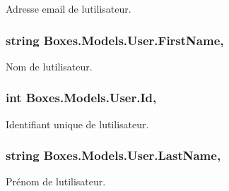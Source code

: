 Adresse email de l\textquotesingle{}utilisateur. 

\subsubsection[{\texorpdfstring{First\+Name}{FirstName}}]{\setlength{\rightskip}{0pt plus 5cm}string Boxes.\+Models.\+User.\+First\+Name\hspace{0.3cm}{\ttfamily [get]}, {\ttfamily [set]}}\hypertarget{class_boxes_1_1_models_1_1_user_aa913f41f67791db983b4189c205c1cb9}{}\label{class_boxes_1_1_models_1_1_user_aa913f41f67791db983b4189c205c1cb9}


Nom de l\textquotesingle{}utilisateur. 

\subsubsection[{\texorpdfstring{Id}{Id}}]{\setlength{\rightskip}{0pt plus 5cm}int Boxes.\+Models.\+User.\+Id\hspace{0.3cm}{\ttfamily [get]}, {\ttfamily [set]}}\hypertarget{class_boxes_1_1_models_1_1_user_a9a98125abfd7776a45590823f984eda1}{}\label{class_boxes_1_1_models_1_1_user_a9a98125abfd7776a45590823f984eda1}


Identifiant unique de l\textquotesingle{}utilisateur. 

\subsubsection[{\texorpdfstring{Last\+Name}{LastName}}]{\setlength{\rightskip}{0pt plus 5cm}string Boxes.\+Models.\+User.\+Last\+Name\hspace{0.3cm}{\ttfamily [get]}, {\ttfamily [set]}}\hypertarget{class_boxes_1_1_models_1_1_user_a550ef99bb25a182acb317bb3978c0d21}{}\label{class_boxes_1_1_models_1_1_user_a550ef99bb25a182acb317bb3978c0d21}


Prénom de l\textquotesingle{}utilisateur. 

